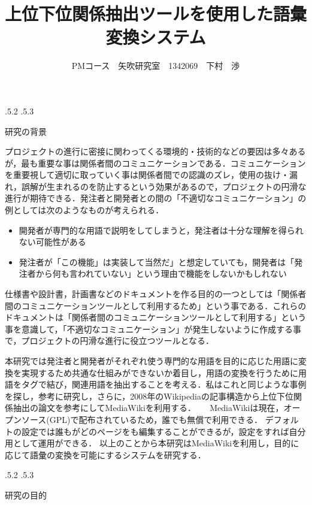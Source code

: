 \documentclass[uplatex]{jsarticle}
\title{\vspace{-14mm}上位下位関係抽出ツールを使用した語彙変換システム}
\author{PMコース　矢吹研究室　1342069　下村　渉}
\date{}%
\makeatletter
\renewcommand{\section}{%
    \if@slide\clearpage\fi
    \@startsection{section}{1}{\z@}%
    {\Cvs \@plus.5\Cdp \@minus.2\Cdp}%
    {.5\Cvs \@plus.3\Cdp}%
    {\normalfont\raggedright}}
\makeatother
\begin{document}
\maketitle





\section{研究の背景}

プロジェクトの進行に密接に関わってくる環境的・技術的などの要因は多々あるが，最も重要な事は関係者間のコミュニケーションである．コミュニケーションを重要視して適切に取っていく事は関係者間での認識のズレ，使用の抜け・漏れ，誤解が生まれるのを防止するという効果があるので，プロジェクトの円滑な進行が期待できる．発注者と開発者との間の「不適切なコミュニケーション」の例としては次のようなものが考えられる．
\begin{itemize}
\item 開発者が専門的な用語で説明をしてしまうと，発注者は十分な理解を得られない可能性がある
\item 発注者が「この機能」は実装して当然だ」と想定していても，開発者は「発注者から何も言われていない」という理由で機能をしないかもしれない
\end{itemize}

仕様書や設計書，計画書などのドキュメントを作る目的の一つとしては「関係者間のコミュニケーションツールとして利用するため」という事である．これらのドキュメントは「関係者間のコミュニケーションツールとして利用する」という事を意識して，「不適切なコミュニケーション」が発生しないように作成する事で，プロジェクトの円滑な進行に役立つツールとなる\cite{a}．

本研究では発注者と開発者がそれぞれ使う専門的な用語を目的に応じた用語に変換を実現するため共通な仕組みができないか着目し，用語の変換を行うために用語をタグで結び，関連用語を抽出することを考える．私はこれと同じような事例を探し，参考に研究し，さらに，2008年のWikipediaの記事構造から上位下位関係抽出の論文を参考にしてMediaWikiを利用する\cite{b}．
　
MediaWikiは現在，オープンソース(GPL)で配布されているため，誰でも無償で利用できる\cite{c}．
デフォルトの設定では誰もがどのページをも編集することができるが，設定をすれば自分用として運用ができる．
以上のことから本研究はMediaWikiを利用し，目的に応じて語彙の変換を可能にするシステムを研究する．





\section{研究の目的}
\end{document}
